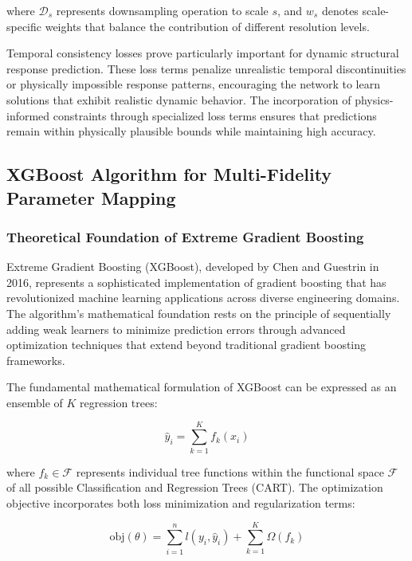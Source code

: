 \documentclass[12pt,a4paper]{report}
\begin{document}
where $\mathcal{D}_s$ represents downsampling operation to scale $s$, and $w_s$ denotes scale-specific weights that balance the contribution of different resolution levels.

Temporal consistency losses prove particularly important for dynamic structural response prediction. These loss terms penalize unrealistic temporal discontinuities or physically impossible response patterns, encouraging the network to learn solutions that exhibit realistic dynamic behavior. The incorporation of physics-informed constraints through specialized loss terms ensures that predictions remain within physically plausible bounds while maintaining high accuracy.



\subsection{XGBoost Algorithm for Multi-Fidelity Parameter Mapping}

\subsubsection*{Theoretical Foundation of Extreme Gradient Boosting}

Extreme Gradient Boosting (XGBoost), developed by Chen and Guestrin in 2016, represents a sophisticated implementation of gradient boosting that has revolutionized machine learning applications across diverse engineering domains. The algorithm's mathematical foundation rests on the principle of sequentially adding weak learners to minimize prediction errors through advanced optimization techniques that extend beyond traditional gradient boosting frameworks.

The fundamental mathematical formulation of XGBoost can be expressed as an ensemble of $K$ regression trees:

\begin{equation}
\hat{y}_i = \sum_{k=1}^K f_k(x_i)
\end{equation}

where $f_k \in \mathcal{F}$ represents individual tree functions within the functional space $\mathcal{F}$ of all possible Classification and Regression Trees (CART).  
The optimization objective incorporates both loss minimization and regularization terms:

\begin{equation}
\text{obj}(\theta) = \sum_{i=1}^n l(y_i, \hat{y}_i) + \sum_{k=1}^K \Omega(f_k)
\end{equation}
\end{document}
